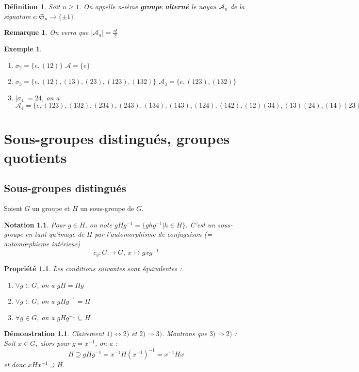 \documentclass[a4paper, oneside]{report}
\theoremstyle{break}
\newtheorem{defi}[thm]{Définition}
\newtheorem{propr}[thm]{Propriété}
\newtheorem{nota}[thm]{Notation}
\newtheorem{exem}[thm]{Exemple}
\newtheorem{remar}[thm]{Remarque}
\newtheorem*{demo}{Démonstration}
\newcommand{\sg}{sous-groupe }
\renewcommand{\S}{\mathfrak{S}}
\begin{document}
\begin{defi}
	Soit $n\geq 1$. On appelle n-ième \textbf{groupe alterné} le noyau $\mathcal{A}_n$ de la signature $\epsilon:\S_n\rightarrow \{\pm 1\}$.
\end{defi}

\begin{remar}
	On verra que $|\mathcal{A}_n|=\frac{n!}{2}$
\end{remar}

\begin{exem}
	\begin{enumerate}
		\item $\sigma_2=\{e,(12)\}$ $\mathcal{A}=\{e\}$
		\item $\sigma_3=\{e, (12), (13), (23), (123), (132)\}$ $\mathcal{A}_3=\{e,(123),(132)\}$
		\item $|\sigma_4|=24$, on a $\mathcal{A}_4=\{e,(123),(132),(234),(243),(134),(143),(124),(142),(12)(34), (13)(24), (14)(23)\}$
	\end{enumerate}
\end{exem}

\chapter{Sous-groupes distingués, groupes quotients}
\section{Sous-groupes distingués}

Soient $G$ un groupe et $H$ un \sg de $G$.

\begin{nota}
	Pour $g\in H$, on note $gHg^{-1}=\{ghg^{-1}| h\in H\}$. C'est un \sg en tant qu'image de $H$ par l'automorphisme de conjugaison (= automorphisme intérieur)
	$$c_g:G\rightarrow G,~x\mapsto gxg^{-1}$$
\end{nota}

\begin{propr}
	Les conditions suivantes sont équivalentes :
	\begin{enumerate}
		\item $\forall g\in G$, on a $gH=Hg$
		\item $\forall g\in G$, on a $gHg^{-1}=H$
		\item $\forall g\in G$, on a $gHg^{-1}\subseteq H$
	\end{enumerate}
\end{propr}

\begin{demo}
	Clairement $1) \Leftrightarrow 2)$ et $2) \Rightarrow 3)$. Montrons que $3)\Rightarrow 2)$ :\\
	Soit $x\in G$, alors pour $g=x^{-1}$, on a :
	$$H\supseteq gHg^{-1}=x^{-1}H(x^{-1})^{-1}=x^{-1}Hx$$
	et donc $xHx^{-1}\supseteq H$.	
\end{demo}
\end{document}
